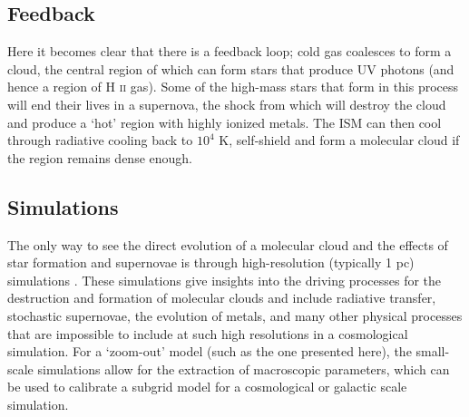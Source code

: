 \subsection{Feedback}

Here it becomes clear that there is a feedback loop; cold gas coalesces to form a cloud, the central region of which can form stars that produce UV photons (and hence a region of H \textsc{ii} gas).
Some of the high-mass stars that form in this process will end their lives in a supernova, the shock from which will destroy the cloud and produce a `hot' region with highly ionized metals.
The ISM can then cool through radiative cooling back to $10^4$ K, self-shield and form a molecular cloud if the region remains dense enough.

\subsection{Simulations} 

The only way to see the direct evolution of a molecular cloud and the effects of star formation and supernovae is through high-resolution (typically 1 pc) simulations \citep{martizzi_supernova_2015, girichidis_silcc_2016}.
These simulations give insights into the driving processes for the destruction and formation of molecular clouds and include radiative transfer, stochastic supernovae, the evolution of metals, and many other physical processes that are impossible to include at such high resolutions in a cosmological simulation.
For a `zoom-out' model (such as the one presented here), the small-scale simulations allow for the extraction of macroscopic parameters, which can be used to calibrate a subgrid model for a cosmological or galactic scale simulation.

\begin{table}[hb]
    \centering
    \caption{Overview of the typical densities of the different phases of gas in the ISM, with $T$ the temperature and $\rho$ the gaseous gas density. Data adapted from \citet{ferriere_interstellar_2001}.}
    \label{tab:ism}
\end{table}
